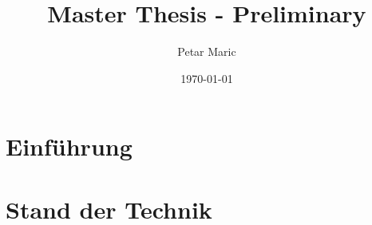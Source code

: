 \documentclass[11pt,a4paper,english]{article} %
\title{Master Thesis - Preliminary } %
\author{Petar Maric}%
\date{\today} %
\begin{document}
\maketitle
\newpage
\tableofcontents
\newpage
\section{Einführung}
\begin{comment}
- Thema und Aufgabenstellung
  ○ Thema
    § Aktuelle bzw. Historische Bezüge herstellen
    § Größeren Bezugsrahmen darstellen
      □ Vom allg. Meinen auf meine Aufgabenstellung kommen
  ○ Aufgabenstellung
    § Wichtigste Punkte aus der offiziellen Aufgabenstellung mit der eigenen Formulierung umschreiben (ggf. Offizielle AGST in die Arbeit einfügen)
    § Ziele der Untersuchung mit themenrelevanten Teilfragen
    § Abgrenzung des Untersuchungsgegenstandes mit Begründung
- Vorgehensweise
  ○ Gang der Untersuchung darlegen
    § Welche Schritte bin ich gegangen um an mein Ziel zu kommen
  ○ Vorgehensweise darlegen (Orientierung an der Gliederung)
  ○ Begründung zur Vorgehensweise liefern
    § Input warum ich so und nicht anders vorgegangen bin
- Ausschluss/ Eingrenzung
  ○ Beschreiben welche Themengebiete nich behandelt werden
    § Begründen
  ○ Relevanz des Themas unterstreichen
  ○ Nach Fertigstellung der Arbeit
    § Erneut prüfen

\end{comment}

\section{Stand der Technik}





\newpage
\printbibliography
\end{document}
